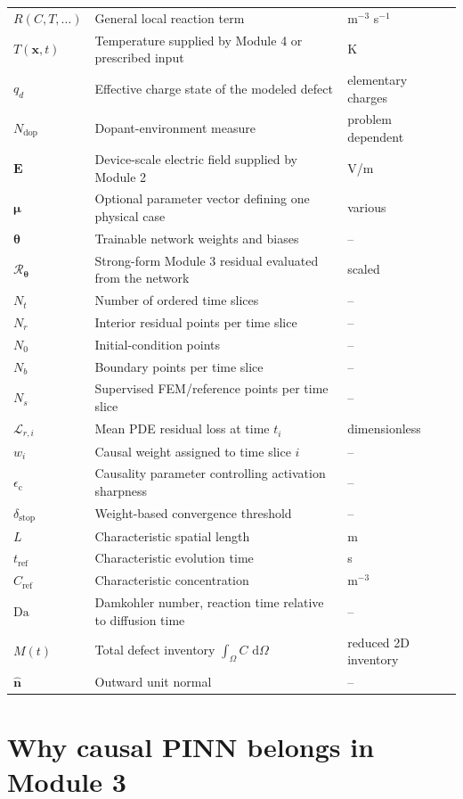 \documentclass[11pt]{article}
\newcommand{\thetav}{\bm{\theta}}
\newcommand{\muv}{\bm{\mu}}
\newcommand{\xv}{\bm{x}}
\newcommand{\Rnet}{\mathcal{R}_{\thetav}}
\newcommand{\Om}{\Omega}
\newcommand{\Cref}{C_{\mathrm{ref}}}
\newcommand{\tref}{t_{\mathrm{ref}}}
\newcommand{\Da}{\mathrm{Da}}
\newcommand{\epsc}{\epsilon_{\mathrm{c}}}
\newcommand{\deltaStop}{\delta_{\mathrm{stop}}}
\providecommand{\dd}{\,\mathrm{d}}
\begin{document}
\begin{longtable}{p{} p{} p{}}
$R(C,T,\ldots)$ & General local reaction term & m$^{-3}$ s$^{-1}$ \\
$T(\xv,t)$ & Temperature supplied by Module 4 or prescribed input & K \\
$q_d$ & Effective charge state of the modeled defect & elementary charges \\
$N_{\mathrm{dop}}$ & Dopant-environment measure & problem dependent \\
$\mathbf{E}$ & Device-scale electric field supplied by Module 2 & V/m \\
$\muv$ & Optional parameter vector defining one physical case & various \\
$\thetav$ & Trainable network weights and biases & -- \\
$\Rnet$ & Strong-form Module 3 residual evaluated from the network & scaled \\
$N_t$ & Number of ordered time slices & -- \\
$N_r$ & Interior residual points per time slice & -- \\
$N_0$ & Initial-condition points & -- \\
$N_b$ & Boundary points per time slice & -- \\
$N_s$ & Supervised FEM/reference points per time slice & -- \\
$\mathcal{L}_{r,i}$ & Mean PDE residual loss at time $t_i$ & dimensionless \\
$w_i$ & Causal weight assigned to time slice $i$ & -- \\
$\epsc$ & Causality parameter controlling activation sharpness & -- \\
$\deltaStop$ & Weight-based convergence threshold & -- \\
$L$ & Characteristic spatial length & m \\
$\tref$ & Characteristic evolution time & s \\
$\Cref$ & Characteristic concentration & m$^{-3}$ \\
$\Da$ & Damkohler number, reaction time relative to diffusion time & -- \\
$M(t)$ & Total defect inventory $\int_{\Om} C\,\dd\Om$ & reduced 2D inventory \\
$\hat{\mathbf n}$ & Outward unit normal & -- \\
\bottomrule
\end{longtable}

\section{Why causal PINN belongs in Module 3}
\end{document}
